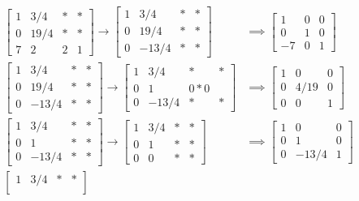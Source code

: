 \documentclass{article}
\begin{document}
\begin{enumerate}
\begin{soln}
\begin{align*}
				\begin{bmatrix}
					1 & 3/4 & * & * \\
					0 & 19/4 & * & * \\
					7 & 2 & 2 & 1
				\end{bmatrix} \to \begin{bmatrix}
					1 & 3/4 & * & * \\
					0 & 19/4 & * & * \\
					0 & -13/4 & * & * 
				\end{bmatrix} &\implies \begin{bmatrix}
					1 & 0 & 0 \\
					0 & 1 & 0 \\
					-7 & 0 & 1
				\end{bmatrix} \\
				\begin{bmatrix}
					1 & 3/4 & * & * \\
					0 & 19/4 & * & * \\
					0 & -13/4 & * & *
				\end{bmatrix} \to \begin{bmatrix}
					1 & 3/4 & * & * \\
					0 & 1 & 0 * 0 \\
					0 & -13/4 & * & *
				\end{bmatrix} &\implies \begin{bmatrix}
					1 & 0 & 0 \\
					0 & 4/19 & 0 \\
					0 & 0 & 1
				\end{bmatrix} \\
				\begin{bmatrix}
					1 & 3/4 & * & * \\
					0 & 1 & * & * \\
					0 & -13/4 & * & *
				\end{bmatrix} \to \begin{bmatrix}
					1 & 3/4 & * & * \\
					0 & 1 & * & * \\
					0 & 0 & * & *
				\end{bmatrix} &\implies \begin{bmatrix}
					1 & 0 & 0 \\
					0 & 1 & 0 \\
					0 & -13/4 & 1
				\end{bmatrix} \\
				\begin{bmatrix}
					1 & 3/4 & * & * \\

\end{bmatrix}
\end{align*}
\end{soln}
\end{enumerate}
\end{document}

